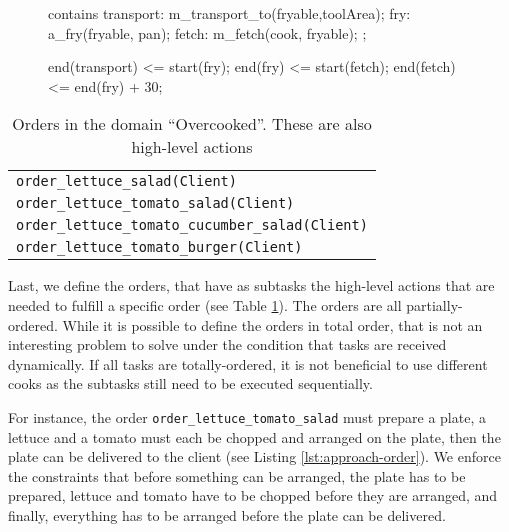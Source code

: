\begin{figure}
  \begin{anmlcode}
  [all] contains {
    transport: m_transport_to(fryable,toolArea);
    fry: a_fry(fryable, pan);
    fetch: m_fetch(cook, fryable);
  };
  
  end(transport) <= start(fry);
  end(fry) <= start(fetch);
  end(fetch) <= end(fry) + 30; 
  \end{anmlcode}
  \label{lst:approach-fry}
\end{figure}

\begin{table}
  \centering
  \begin{tabular}{l}
    \verb|order_lettuce_salad(Client)|\\
    \verb|order_lettuce_tomato_salad(Client)| \\
    \verb|order_lettuce_tomato_cucumber_salad(Client)|  \\
    \verb|order_lettuce_tomato_burger(Client)|
  \end{tabular}
  \caption{Orders in the domain ``Overcooked''. These are also high-level actions}
  \label{tab:approach-domain-orders}
\end{table}


Last, we define the orders, that have as subtasks the high-level actions that are needed to fulfill a specific order (see Table \ref{tab:approach-domain-orders}).
The orders are all partially-ordered.
While it is possible to define the orders in total order, that is not an interesting problem to solve under the condition that tasks are received dynamically.
If all tasks are totally-ordered, it is not beneficial to use different cooks as the subtasks still need to be executed sequentially.

For instance, the order \verb|order_lettuce_tomato_salad| must prepare a plate, a lettuce and a tomato must each be chopped and arranged on the plate, then the plate can be delivered to the client (see Listing \ref{lst:approach-order}).
We enforce the constraints that before something can be arranged, the plate has to be prepared, lettuce and tomato have to be chopped before they are arranged, and finally, everything has to be arranged before the plate can be delivered.

